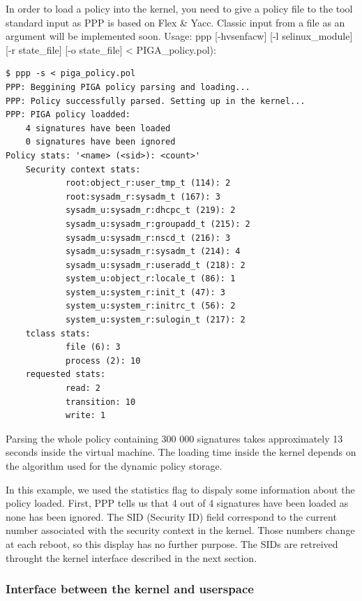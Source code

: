 \documentclass[pdftex,a4paper,titlepage,11pt]{article}
\begin{document}
\smallskip

In order to load a policy into the kernel, you need to give a policy file to the
tool standard input as PPP is based on Flex \& Yacc. Classic input from a file
as an argument will be implemented soon. Usage: ppp [-hvsenfacw] [-l
selinux\_module] [-r state\_file] [-o state\_file] < PIGA\_policy.pol):

\begin{lstlisting}
$ ppp -s < piga_policy.pol
PPP: Beggining PIGA policy parsing and loading...
PPP: Policy successfully parsed. Setting up in the kernel...
PPP: PIGA policy loadded:
    4 signatures have been loaded
    0 signatures have been ignored
Policy stats: '<name> (<sid>): <count>'
    Security context stats:
            root:object_r:user_tmp_t (114): 2
            root:sysadm_r:sysadm_t (167): 3
            sysadm_u:sysadm_r:dhcpc_t (219): 2
            sysadm_u:sysadm_r:groupadd_t (215): 2
            sysadm_u:sysadm_r:nscd_t (216): 3
            sysadm_u:sysadm_r:sysadm_t (214): 4
            sysadm_u:sysadm_r:useradd_t (218): 2
            system_u:object_r:locale_t (86): 1
            system_u:system_r:init_t (47): 3
            system_u:system_r:initrc_t (56): 2
            system_u:system_r:sulogin_t (217): 2
    tclass stats:
            file (6): 3
            process (2): 10
    requested stats:
            read: 2
            transition: 10
            write: 1
\end{lstlisting}

\medskip

Parsing the whole policy containing 300 000 signatures takes approximately 13
seconds inside the virtual machine. The loading time inside the kernel depends
on the algorithm used for the dynamic policy storage.

\bigskip

In this example, we used the statistics flag to dispaly some information about
the policy loaded. First, PPP tells us that 4 out of 4 signatures have been
loaded as none has been ignored. The SID (Security ID) field correspond to the
current number associated with the security context in the kernel. Those numbers
change at each reboot, so this display has no further purpose. The SIDs are
retreived throught the kernel interface described in the next section.

\subsubsection{Interface between the kernel and userspace}
\end{document}
